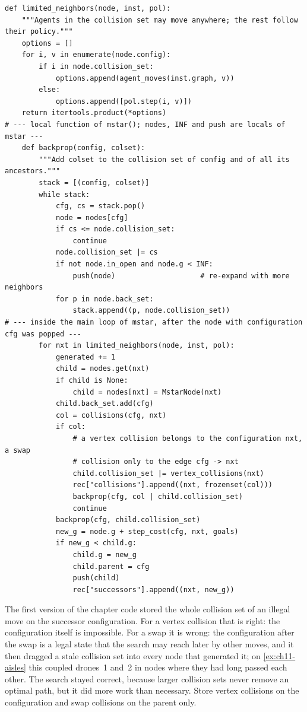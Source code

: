 \begin{lstlisting}[caption={The core of \mstar (from \code{code/ch11\_mstar.py}): the limited neighbors, the backpropagation (a local function of \code{mstar}) and the successor loop of the main loop.},label={lst:ch11-core}]
def limited_neighbors(node, inst, pol):
    """Agents in the collision set may move anywhere; the rest follow their policy."""
    options = []
    for i, v in enumerate(node.config):
        if i in node.collision_set:
            options.append(agent_moves(inst.graph, v))
        else:
            options.append([pol.step(i, v)])
    return itertools.product(*options)
# --- local function of mstar(); nodes, INF and push are locals of mstar ---
    def backprop(config, colset):
        """Add colset to the collision set of config and of all its ancestors."""
        stack = [(config, colset)]
        while stack:
            cfg, cs = stack.pop()
            node = nodes[cfg]
            if cs <= node.collision_set:
                continue
            node.collision_set |= cs
            if not node.in_open and node.g < INF:
                push(node)                    # re-expand with more neighbors
            for p in node.back_set:
                stack.append((p, node.collision_set))
# --- inside the main loop of mstar, after the node with configuration cfg was popped ---
        for nxt in limited_neighbors(node, inst, pol):
            generated += 1
            child = nodes.get(nxt)
            if child is None:
                child = nodes[nxt] = MstarNode(nxt)
            child.back_set.add(cfg)
            col = collisions(cfg, nxt)
            if col:
                # a vertex collision belongs to the configuration nxt, a swap
                # collision only to the edge cfg -> nxt
                child.collision_set |= vertex_collisions(nxt)
                rec["collisions"].append((nxt, frozenset(col)))
                backprop(cfg, col | child.collision_set)
                continue
            backprop(cfg, child.collision_set)
            new_g = node.g + step_cost(cfg, nxt, goals)
            if new_g < child.g:
                child.g = new_g
                child.parent = cfg
                push(child)
                rec["successors"].append((nxt, new_g))
\end{lstlisting}

\begin{pitfall}
The first version of the chapter code stored the whole collision set of an
illegal move on the successor configuration. For a vertex collision that
is right: the configuration itself is impossible. For a swap it is wrong:
the configuration after the swap is a legal state that the search may reach
later by other moves, and it then dragged a stale collision set into every
node that generated it; on \cref{ex:ch11-aisles} this coupled drones~1
and~2 in nodes where they had long passed each other. The search stayed
correct, because larger collision sets never remove an optimal path, but it
did more work than necessary. Store vertex collisions on the configuration
and swap collisions on the parent only.
\end{pitfall}

